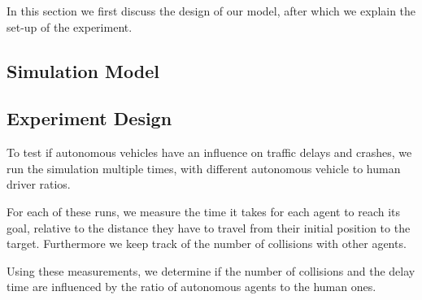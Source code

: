 In this section we first discuss the design of our model, after which we explain the set-up of the experiment.

\subsection{Simulation Model}
\label{sub:method:model}



\subsection{Experiment Design}
\label{sub:method:design}
To test if autonomous vehicles have an influence on traffic delays and crashes, we run the simulation multiple times, with different autonomous vehicle to human driver ratios.

For each of these runs, we measure the time it takes for each agent to reach its goal, relative to the distance they have to travel from their initial position to the target. Furthermore we keep track of the number of collisions with other agents. 

Using these measurements, we  determine if the number of collisions and the delay time are influenced by the ratio of autonomous agents to the human ones. 
